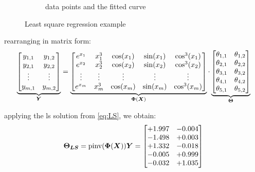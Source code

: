 \begin{figure}
\begin{subfigure}{0.49\textwidth}
        \caption{data points and the fitted curve}
        \label{fig:LinearRegression}
    \end{subfigure}
    \caption{Least square regression example}
\end{figure}

rearranging in matrix form: 
\begin{equation}
    \underbrace{\begin{bmatrix}
        y_{1,1} & y_{1,2} \\
        y_{2,1} & y_{2,2} \\
        \vdots & \vdots \\
        y_{m,1} & y_{m,2} \\
    \end{bmatrix}}_{\bm{Y}}
    =
    \underbrace{\begin{bmatrix}
        e^{x_1} & x_1^3 & \cos(x_1) & \sin(x_1) & \cos^3(x_1) \\
        e^{x_2} & x_2^3 & \cos(x_2) & \sin(x_2) & \cos^3(x_2) \\
        \vdots & \vdots & \vdots & \vdots & \vdots \\
        e^{x_m} & x_m^3 & \cos(x_m) & \sin(x_m) & \cos^3(x_m) \\
    \end{bmatrix}}_{\bm{\Phi}(\bm{X})}
    \cdot
    \underbrace{\begin{bmatrix}
        \theta_{1,1}  & \theta_{1,2} \\
        \theta_{2,1}  & \theta_{2,2} \\
        \theta_{3,1}  & \theta_{3,2} \\
        \theta_{4,1}  & \theta_{4,2} \\
        \theta_{5,1}  & \theta_{5,2} \\
    \end{bmatrix}}_{\bm{\Theta}}
\end{equation}

applying the \gls{ls} solution from \autoref{eq:LS}, we obtain:
\begin{equation*}
    \bm{\Theta_{LS}} = \text{pinv}(\bm{\Phi}(\bm{X}))\bm{Y} = 
    \begin{bmatrix}
        +1.997 & -0.004 \\
        -1.498 & +0.003 \\
        +1.332 & -0.018 \\
        -0.005 &  +0.999 \\
        -0.032 & +1.035 
    \end{bmatrix}
\end{equation*}

